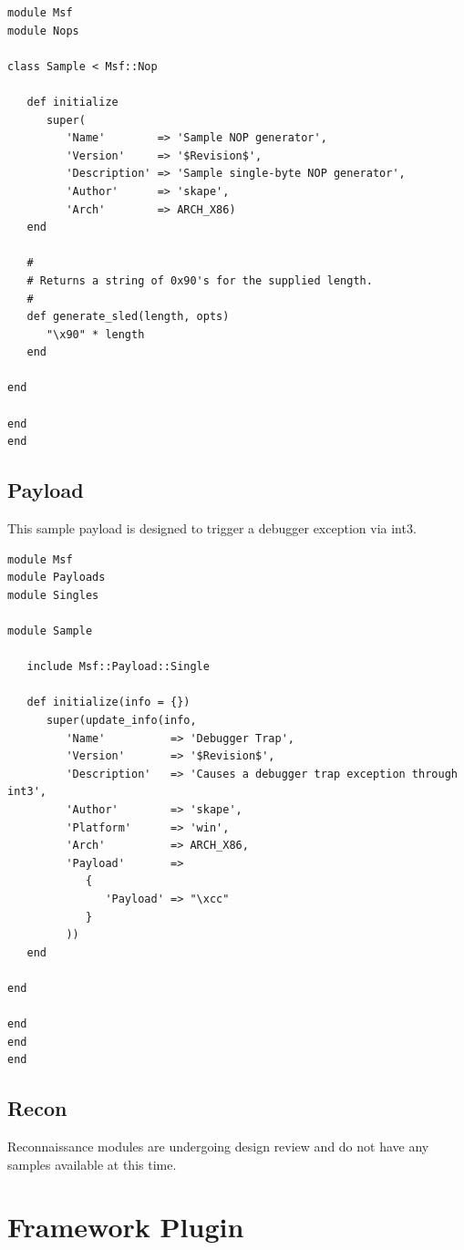 \documentclass{report}
\begin{document}
\footnotesize{
\begin{verbatim}
module Msf
module Nops

class Sample < Msf::Nop

   def initialize
      super(
         'Name'        => 'Sample NOP generator',
         'Version'     => '$Revision$',
         'Description' => 'Sample single-byte NOP generator',
         'Author'      => 'skape',
         'Arch'        => ARCH_X86)
   end

   #
   # Returns a string of 0x90's for the supplied length.
   #
   def generate_sled(length, opts)
      "\x90" * length
   end

end

end
end
\end{verbatim}}

        \subsection{Payload}

\par
This sample payload is designed to trigger a debugger exception via
int3.

\footnotesize{
\begin{verbatim}
module Msf
module Payloads
module Singles

module Sample

   include Msf::Payload::Single

   def initialize(info = {})
      super(update_info(info,
         'Name'          => 'Debugger Trap',
         'Version'       => '$Revision$',
         'Description'   => 'Causes a debugger trap exception through int3',
         'Author'        => 'skape',
         'Platform'      => 'win',
         'Arch'          => ARCH_X86,
         'Payload'       =>
            {
               'Payload' => "\xcc"
            }
         ))
   end

end

end
end
end
\end{verbatim}}

        \subsection{Recon}

\par
Reconnaissance modules are undergoing design review and do not have
any samples available at this time.

    \section{Framework Plugin}
\end{document}

